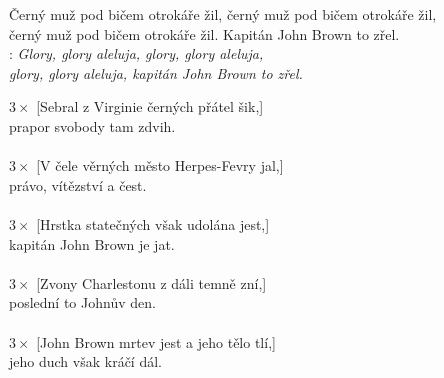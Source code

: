 
Černý muž pod bičem otrokáře žil, černý muž pod bičem otrokáře žil,\\
černý muž pod bičem otrokáře žil. Kapitán John Brown to zřel.\\
 
\textregistered:
\emph{
Glory, glory aleluja, glory, glory aleluja,\\
glory, glory aleluja, kapitán John Brown to zřel.\\
}

$3\times$ [Sebral z Virginie černých přátel šik,]\\
prapor svobody tam zdvih.\\
\textregistered\\

$3\times$ [V čele věrných město Herpes-Fevry jal,]\\
právo, vítězství a čest.\\
\textregistered\\

$3\times$ [Hrstka statečných však udolána jest,]\\
kapitán John Brown je jat.\\
\textregistered\\

$3\times$ [Zvony Charlestonu z dáli temně zní,]\\
poslední to Johnův den.\\
\textregistered\\

$3\times$ [John Brown mrtev jest a jeho tělo tlí,]\\
jeho duch však kráčí dál.\\
\textregistered

\newpage

